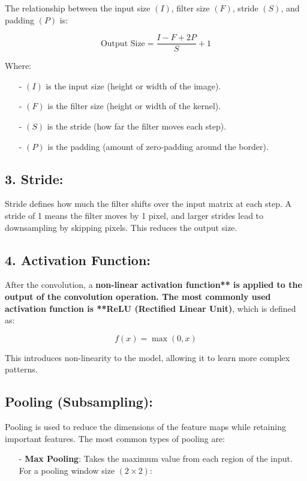 \documentclass[10pt]{article}
\begin{document}
The relationship between the input size $( I )$, filter size $( F )$, stride $( S )$, and padding $( P )$ is:

$$
\text{Output Size} = \frac{I - F + 2P}{S} + 1
$$

Where:

\begin{itemize}
   \item [-] $( I )$ is the input size (height or width of the image).
   \item [-] $( F )$ is the filter size (height or width of the kernel).
   \item [-] $( S )$ is the stride (how far the filter moves each step).
   \item [-] $( P )$ is the padding (amount of zero-padding around the border).
\end{itemize}

\subsection{ 3. {\bf Stride}:}
Stride defines how much the filter shifts over the input matrix at each step. A stride of 1 means the filter moves by 1 pixel, and larger strides lead to downsampling by skipping pixels. This reduces the output size.

\subsection{ 4. {\bf Activation Function}:}
After the convolution, a {\bf non-linear activation function** is applied to the output of the convolution operation. The most commonly used activation function is **ReLU (Rectified Linear Unit)}, which is defined as:

$$
f(x) = \max(0, x)
$$

This introduces non-linearity to the model, allowing it to learn more complex patterns.

\subsection{{\bf Pooling (Subsampling)}:}
Pooling is used to reduce the dimensions of the feature maps while retaining important features. The most common types of pooling are:

\begin{itemize}
   \item [-] {\bf Max Pooling}: Takes the maximum value from each region of the input. For a pooling window size $( 2 \times 2 )$:
\end{itemize}
\end{document}
